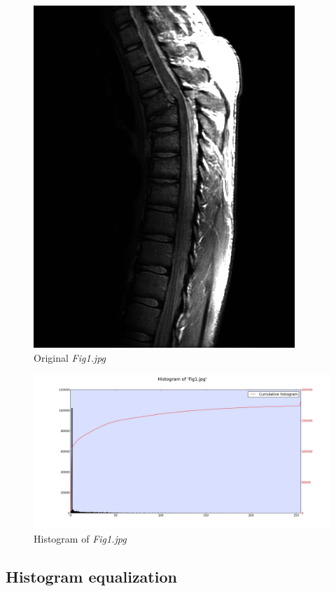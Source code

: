     \begin{figure}[!htb]\centering
        \includegraphics[width=0.7\linewidth]{./images/1/Fig1.jpg}
        \caption{Original \textit{Fig1.jpg}}\label{diagram:fig1}
    \end{figure}

    \begin{figure}[!htb]\centering
        \includegraphics[width=\linewidth]{./images/1/Histogram_Fig1.jpg}
        \caption{Histogram of \textit{Fig1.jpg}}\label{diagram:hist_fig1}
    \end{figure}

    \subsection{Histogram equalization}

